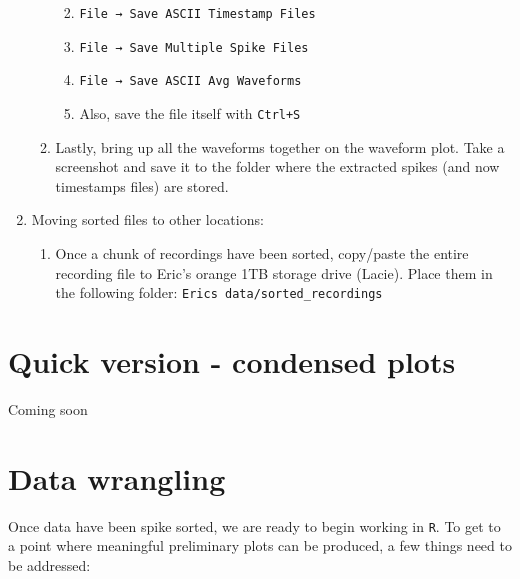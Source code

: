 \documentclass[
]{book}
\providecommand{\tightlist}{%
  \setlength{\itemsep}{0pt}\setlength{\parskip}{0pt}}
\begin{document}
\begin{enumerate}
\begin{enumerate}
    \begin{enumerate}
    \def\labelenumiii{\arabic{enumiii}.}
    \tightlist
    \item
      \texttt{File\ →\ Save\ ASCII\ Timestamp\ Files}
    \item
      \texttt{File\ →\ Save\ Multiple\ Spike\ Files}
    \item
      \texttt{File\ →\ Save\ ASCII\ Avg\ Waveforms}
    \item
      Also, save the file itself with \texttt{Ctrl+S}
    \end{enumerate}
  \item
    Lastly, bring up all the waveforms together on the waveform
    plot. Take a screenshot and save it to the folder where the
    extracted spikes (and now timestamps files) are stored.
  \end{enumerate}
\item
  Moving sorted files to other locations:

  \begin{enumerate}
  \def\labelenumii{\arabic{enumii}.}
  \tightlist
  \item
    Once a chunk of recordings have been sorted, copy/paste the
    entire recording file to Eric's orange 1TB storage drive
    (Lacie). Place them in the following folder:
    \texttt{Eric\textquotesingle{}s\ data/sorted\_recordings}
  \end{enumerate}
\end{enumerate}

\hypertarget{quick-version---condensed-plots}{%
\chapter{Quick version - condensed plots}\label{quick-version---condensed-plots}}

Coming soon

\hypertarget{data-wrangling}{%
\chapter{Data wrangling}\label{data-wrangling}}

Once data have been spike sorted, we are ready to begin working in
\texttt{R}. To get to a point where meaningful preliminary plots can be
produced, a few things need to be addressed:
\end{document}
